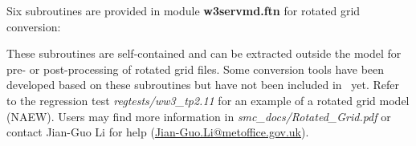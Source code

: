 Six subroutines are provided in module {\bf w3servmd.ftn} for rotated grid
conversion:
\begin{vlist}
\end{vlist}
These subroutines are self-contained and can be extracted outside the model
for pre- or post-processing of rotated grid files.  Some conversion tools have
been developed based on these subroutines but have not been included in \ws\
yet. Refer to the regression test \emph{regtests/ww3\_tp2.11} for an example
of a rotated grid model (NAEW).  Users may find more information in
\emph{smc\_docs/Rotated\_Grid.pdf} or contact Jian-Guo Li for help
(\url{Jian-Guo.Li@metoffice.gov.uk}).
